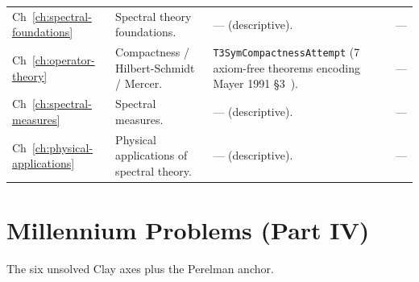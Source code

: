 \begin{table}[h]
\begin{tabular}{p{1.7cm}p{4.2cm}p{5.6cm}c}
Ch~\ref{ch:spectral-foundations}
& Spectral theory foundations.
& --- (descriptive).
& --- \\
Ch~\ref{ch:operator-theory}
& Compactness / Hilbert-Schmidt / Mercer.
& \texttt{T3SymCompactnessAttempt} (7 axiom-free theorems encoding Mayer 1991 \S3~\cite{mayer1991}).
& --- \\
Ch~\ref{ch:spectral-measures}
& Spectral measures.
& --- (descriptive).
& --- \\
Ch~\ref{ch:physical-applications}
& Physical applications of spectral theory.
& --- (descriptive).
& --- \\
\bottomrule
\end{tabular}
\end{table}

\FloatBarrier

\section{Millennium Problems (Part IV)}
\label{sec:lean-xref-millennium}

The six unsolved Clay axes plus the Perelman anchor.

